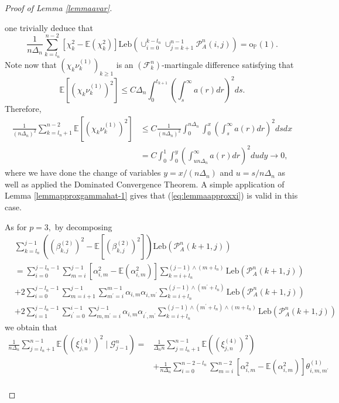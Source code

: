 \documentclass{article}
\theoremstyle{plain}
\theoremstyle{definition}
\theoremstyle{remark}
\newcommand{\Leb}{\ensuremath{\mathrm{Leb}}}
\begin{document}
\begin{appendix}
\begin{proof}[Proof of Lemma \ref{lemmaavar}]
\begin{description}
		one trivially deduce that 
		\[
		\frac{1}{n\Delta_{n}}\sum_{k=l_{n}}^{n-2}[\chi_{k}^{2}-\mathbb{E}(\chi_{k}^{2})]\Leb(\cup_{i=0}^{k-l_{n}}\cup_{j=k+1}^{n-1}\mathcal{P}_{A}^{n}(i,j))=\mathrm{o}_{\mathbb{P}}(1).
		\]
		Note now that $(\chi_{k}\nu_{k}^{(1)})_{k\geq1}$ is an $(\mathscr{F}_{k}^{n})$-martingale
		difference satisfying that 
		\[
		\mathbb{E}[(\chi_{k}\nu_{k}^{(1)})^{2}]\leq C\Delta_{n}\int_{0}^{t_{k+1}}(\int_{s}^{\infty}a(r)dr)^{2}ds.
		\]
		Therefore, 
		\begin{align*}
			\frac{1}{(n\Delta_{n})^{2}}\sum_{k=l_{n}+1}^{n-2}\mathbb{E}\left[(\chi_{k}\nu_{k}^{(1)})^{2}\right] & \leq C\frac{1}{(n\Delta_{n})^{2}}\int_{0}^{n\Delta_{n}}\int_{0}^{x}(\int_{s}^{\infty}a(r)dr)^{2}dsdx\\
			& =C\int_{0}^{1}\int_{0}^{y}(\int_{un\Delta_{n}}^{\infty}a(r)dr)^{2}dudy\rightarrow0,
		\end{align*}
		where we have done the change of variables $y=x/(n\Delta_{n})$ and
		$u=s/n\Delta_{n}$ as well as applied the Dominated Convergence Theorem.
		A simple application of Lemma \ref{lemmapproxgammahat-1} gives that
		(\ref{eq:lemmaapproxxi}) is valid in this case.
		\item [{$p=4$:}] As for $p=3,$ by decomposing 
		\begin{align*}
			&\sum_{k=l_{n}}^{j-1}\left((\beta_{k,j}^{(2)})^{2}-\mathbb{E}[(\beta_{k,j}^{(2)})^{2}]\right)\Leb(\mathcal{P}_{A}^{n}(k+1,j)) \\
			& =\sum_{i=0}^{j-l_{n}-1}\sum_{m=i}^{j-1}[\alpha_{i,m}^{2}-\mathbb{E}(\alpha_{i,m}^{2})]\sum_{k=i+l_{n}}^{(j-1)\land(m+l_{n})}\Leb(\mathcal{P}_{A}^{n}(k+1,j))\\
			& +2\sum_{i=0}^{j-l_{n}-1}\sum_{m=i+1}^{j-1}\sum_{m^{\prime}=i}^{m-1}\alpha_{i,m}\alpha_{i,m^{\prime}}\sum_{k=i+l_{n}}^{(j-1)\land(m^{\prime}+l_{n})}\Leb(\mathcal{P}_{A}^{n}(k+1,j))\\
			& +2\sum_{i=1}^{j-l_{n}-1}\sum_{i^{\prime}=0}^{i-1}\sum_{m,m^{\prime}=i}^{j-1}\alpha_{i,m}\alpha_{i^{\prime},m^{\prime}}\sum_{k=i+l_{n}}^{(j-1)\land(m^{\prime}+l_{n})\land(m+l_{n})}\Leb(\mathcal{P}_{A}^{n}(k+1,j))
		\end{align*}
		we obtain that
		\begin{equation}
			\begin{aligned}\frac{1}{n\Delta_{n}}\sum_{j=l_{n}+1}^{n-1}\mathbb{E}((\xi_{j,n}^{(4)})^{2}\mid\mathscr{G}_{j-1}^{n})= & \frac{1}{\Delta_{n}n}\sum_{j=l_{n}+1}^{n-1}\mathbb{E}((\xi_{j,n}^{(4)})^{2})\\
				& +\frac{1}{n\Delta_{n}}\sum_{i=0}^{n-2-l_{n}}\sum_{m=i}^{n-2}[\alpha_{i,m}^{2}-\mathbb{E}(\alpha_{i,m}^{2})]\theta_{i,m,m^{\prime}}^{(1)}\\

\end{aligned}
\end{equation}
\end{description}
\end{proof}
\end{appendix}
\end{document}
